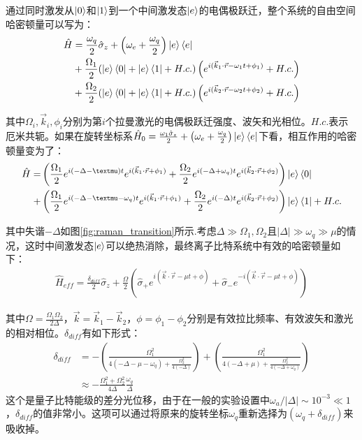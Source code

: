 通过同时激发从$\ket{0}$和$\ket{1}$到一个中间激发态$\ket{e}$的电偶极跃迁，整个系统的自由空间哈密顿量可以写为：
\begin{align}
    \hat{H}&=\frac{\omega_q}{2}\hat{\sigma}_z+\left(\omega_e+\frac{\omega_q}{2}\right)\ket{e}\bra{e}\\
    &+\frac{\Omega_1}{2}(\ket{e}\bra{0}+\ket{e}\bra{1}+H.c.)\left(e^{i(\vec{k}_1\cdot\vec{r}-\omega_1t+\phi_1)}+H.c.\right)\\
    &+\frac{\Omega_2}{2}(\ket{e}\bra{0}+\ket{e}\bra{1}+H.c.)\left(e^{i(\vec{k}_2\cdot\vec{r}-\omega_2t+\phi_2)}+H.c.\right)
\end{align}

其中$\Omega_i,\vec{k}_i, \phi_i$分别为第$i$个拉曼激光的电偶极跃迁强度、波矢和光相位。$H.c.$表示厄米共轭。如果在旋转坐标系$\hat{H}_0=\frac{\omega_1\hat{\sigma}_z}{2}+\left(\omega_e+\frac{\omega_q}{2}\right)\ket{e}\bra{e}$下看，相互作用的哈密顿量变为了：
\begin{align}
    \hat{H}=
    &\left(\frac{\Omega_1}{2}e^{i(-\Delta-\mu)t}e^{i(\vec{k}_1\cdot \vec{r}+\phi_1)}
    +\frac{\Omega_2}{2}e^{i(-\Delta+\omega_q)t}e^{i(\vec{k}_2\cdot \vec{r}+\phi_2)}\right)\ket{e}\bra{0}\\
    +&\left(\frac{\Omega_1}{2}e^{i(-\Delta-\mu-\omega_q)t}e^{i(\vec{k}_1\cdot \vec{r}+\phi_1)}
    +\frac{\Omega_2}{2}e^{i(-\Delta)t}e^{i(\vec{k}_2\cdot \vec{r}+\phi_2)}\right)\ket{e}\bra{1}+H.c.\label{eq:interaction_hamiltonian_yb}
\end{align}

其中失谐$-\Delta$如图\ref{fig:raman_transition}所示.考虑$\Delta\gg\Omega_1,\Omega_2$且$|\Delta|\gg\omega_q\gg\mu$的情况，这时中间激发态$\ket{e}$可以绝热消除，最终离子比特系统中有效的哈密顿量如下：
\begin{align}
    \hat{H}_{eff}=\frac{\delta_{diff}}{2}\hat{\sigma}_z+\frac{\Omega}{2}\left(\hat{\sigma}_+e^{i\left(\vec{k}\cdot\vec{r}-\mu t+\phi\right)}
    +\hat{\sigma}_-e^{-i\left(\vec{k}\cdot\vec{r}-\mu t+\phi\right)}\right)\label{eq:effective_hamiltonian_raman}
\end{align}

其中$\Omega=\frac{\Omega_1\Omega_2}{2\Delta}$，$\vec{k}=\vec{k}_1-\vec{k}_2$，$\phi=\phi_1-\phi_2$分别是有效拉比频率、有效波矢和激光的相对相位。$\delta_{diff}$有如下形式\cite[]{James_Jerke_2007}：
\begin{align}
    \delta_{diff}&=-\left(\frac{\Omega_1^2}{4(-\Delta-\mu-\omega_q)+\frac{\Omega_2^2}{4(-\Delta)}}\right)+\left(\frac{\Omega_1^2}{4(-\Delta+\mu)+\frac{\Omega_2^2}{4(-\Delta+\omega_q)}}\right)\\
    &\approx-\frac{\Omega_1^2+\Omega_2^2}{4\Delta}\frac{\omega_q}{\Delta}
\end{align}
这个是量子比特能级的差分光位移，由于在一般的实验设置中$\omega_a/|\Delta|\sim 10^{-3}\ll 1$，$\delta_{diff}$的值非常小。这项可以通过将原来的旋转坐标$\omega_q$重新选择为$(\omega_q+\delta_{diff})$来吸收掉。

